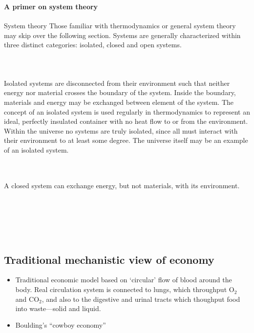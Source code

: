 \begin{svgraybox}
{\large \textbf{A primer on system theory}}
\\\\
System theory 
Those familiar with thermodynamics or general system
theory may skip over the following section.
Systems are generally characterized within three
distinct categories: 
isolated, closed and open systems.\\\\
\\\\
Isolated systems are disconnected from their environment
such that neither energy nor material crosses the
boundary of the system.
Inside the boundary,
materials and energy may be exchanged
between element of the system.
The concept of an isolated system is used regularly
in thermodynamics to represent an ideal,
perfectly insulated container with no heat flow 
to or from the environment.
Within the universe no systems are truly isolated,
since all must interact with their environment
to at least some degree.
The universe itself may be an example of an 
isolated system.

\\\\

A closed system can exchange energy, but not materials,
with its environment.
\\\\ 

\\\\

\\\\

\end{svgraybox}

\subsection{Traditional mechanistic view of economy}
\label{sec:mechanistic}

\begin{itemize}
	\item{Traditional economic model based on `circular' flow of blood around the body. 
	Real circulation system is connected to lungs, which throughput O$_2$ and CO$_2$, 
	and also to the digestive and urinal tracts which thoughput food into waste---solid and liquid.}
	\item{Boulding's ``cowboy economy''}
\end{itemize}

